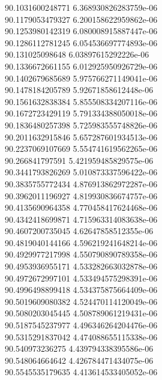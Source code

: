 {90.1031600248771 6.368930826283759e-06 \\
90.1179053479327 6.200158622959862e-06 \\
90.1253980142319 6.080008915887447e-06 \\
90.1286112781245 6.054536697774893e-06 \\
90.131025098648 6.03897615292226e-06 \\
90.1336672661155 6.012925950926729e-06 \\
90.1402679685689 5.975766271149041e-06 \\
90.1478184205789 5.92671858612448e-06 \\
90.1561632838384 5.855508334207116e-06 \\
90.1672723429119 5.791334388050018e-06 \\
90.1836480257398 5.725983555748826e-06 \\
90.2011632915846 5.657287601934513e-06 \\
90.2237069107669 5.554741619562265e-06 \\
90.266841797591 5.421959485829575e-06 \\
90.3441793826269 5.010873337596422e-06 \\
90.3835755772434 4.876913862972287e-06 \\
90.3962011196927 4.819930836674757e-06 \\
90.4135690964358 4.770458417624468e-06 \\
90.4342418699871 4.715963314083638e-06 \\
90.4607200735045 4.62647858512355e-06 \\
90.4819040144166 4.596219241648214e-06 \\
90.4929977217998 4.550790890789358e-06 \\
90.4953936955171 4.533282663032878e-06 \\
90.4972672997101 4.533494575298391e-06 \\
90.4996498899418 4.534375875664409e-06 \\
90.5019609080382 4.524470114120049e-06 \\
90.5080203045445 4.508789061219431e-06 \\
90.5187545237977 4.496346264204476e-06 \\
90.5315291837042 4.474088655115338e-06 \\
90.540973236275 4.439794338395586e-06 \\
90.548064664642 4.426784471434075e-06 \\
90.5545535179635 4.413614533405052e-06 \\
}
